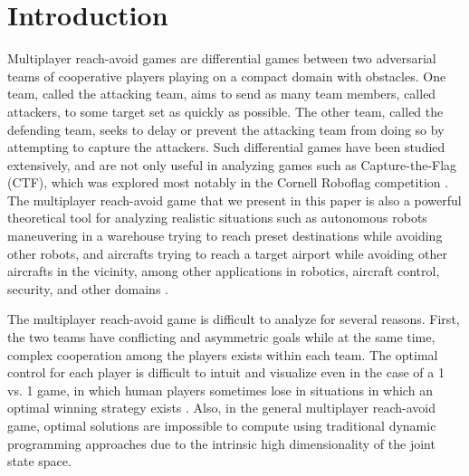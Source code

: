 \section{Introduction}

Multiplayer reach-avoid games are differential games between two adversarial teams of cooperative players playing on a compact domain with obstacles. One team, called the attacking team, aims to send as many team members, called attackers, to some target set as quickly as possible. The other team, called the defending team, seeks to delay or prevent the attacking team from doing so by attempting to capture the attackers. Such differential games have been studied extensively, and are not only useful in analyzing games such as Capture-the-Flag (CTF), which was explored most notably in the Cornell Roboflag competition \cite{HThesis, Huang2011, Earl:2007p101, Campbell:2003p5, Waydo:2003p97, Parasuraman:2005p99}. The multiplayer reach-avoid game that we present in this paper is also a powerful theoretical tool for analyzing realistic situations such as autonomous robots maneuvering in a warehouse trying to reach preset destinations while avoiding other robots, and aircrafts trying to reach a target airport while avoiding other aircrafts in the vicinity, among other applications in robotics, aircraft control, security, and other domains \cite{OFTHEAIRFORCEWASHINGTON:2009p37, Erzberger:2006p44, kiva2009}.


The multiplayer reach-avoid game is difficult to analyze for several reasons. First, the two teams have conflicting and asymmetric goals while at the same time, complex cooperation among the players exists within each team. The optimal control for each player is difficult to intuit and visualize even in the case of a 1 vs. 1 game, in which human players sometimes lose in situations in which an optimal winning strategy exists \cite{HThesis, Huang2011}. Also, in the general multiplayer reach-avoid game, optimal solutions are impossible to compute using traditional dynamic programming approaches due to the intrinsic high dimensionality of the joint state space. 

